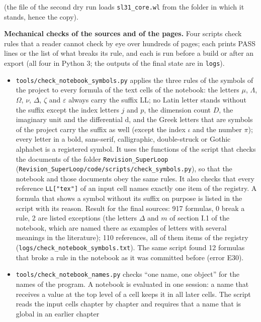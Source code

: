 \documentclass[
  10pt,
]{article}
\providecommand{\tightlist}{%
  \setlength{\itemsep}{0pt}\setlength{\parskip}{0pt}}
\begin{document}
(the file of the second dry run loads \texttt{sl31\_core.wl} from the
folder in which it stands, hence the copy).

\textbf{Mechanical checks of the sources and of the pages.} Four scripts
check rules that a reader cannot check by eye over hundreds of pages;
each prints PASS lines or the list of what breaks its rule, and each is
run before a build or after an export (all four in Python 3; the outputs
of the final state are in \texttt{logs}).

\begin{itemize}
\tightlist
\item
  \texttt{tools/check\_notebook\_symbols.py} applies the three rules of
  the symbols of the project to every formula of the text cells of the
  notebook: the letters \(\mu\), \(\Lambda\), \(\Omega\), \(\nu\),
  \(\Delta\), \(\zeta\) and \(\varepsilon\) always carry the suffix LL;
  no Latin letter stands without the suffix except the index letters
  \(j\) and \(p\), the dimension count \(D\), the imaginary unit and the
  differential d, and the Greek letters that are symbols of the project
  carry the suffix as well (except the index \(\iota\) and the number
  \(\pi\)); every letter in a bold, sans-serif, calligraphic,
  double-struck or Gothic alphabet is a registered symbol. It uses the
  functions of the script that checks the documents of the folder
  \texttt{Revision\_SuperLoop}
  (\texttt{Revision\_SuperLoop/code/scripts/check\_symbols.py}), so that
  the notebook and those documents obey the same rules. It also checks
  that every reference \texttt{LL{[}"tex"{]}} of an input cell names
  exactly one item of the registry. A formula that shows a symbol
  without its suffix on purpose is listed in the script with its reason.
  Result for the final sources: 917 formulas, 0 break a rule, 2 are
  listed exceptions (the letters \(\Delta\) and \(m\) of section I.1 of
  the notebook, which are named there as examples of letters with
  several meanings in the literature); 110 references, all of them items
  of the registry (\texttt{logs/check\_notebook\_symbols.txt}). The same
  script found 12 formulas that broke a rule in the notebook as it was
  committed before (error E30).
\item
  \texttt{tools/check\_notebook\_names.py} checks ``one name, one
  object'' for the names of the program. A notebook is evaluated in one
  session: a name that receives a value at the top level of a cell keeps
  it in all later cells. The script reads the input cells chapter by
  chapter and requires that a name that is global in an earlier chapter

\end{itemize}
\end{document}
